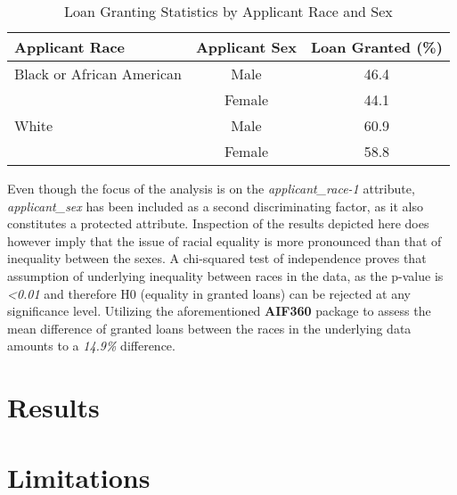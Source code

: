 \begin{table}[htbp]
    \centering
      \begin{tabular}{lcc}
      \toprule
      \textbf{Applicant Race} & \textbf{Applicant Sex} & \textbf{Loan Granted (\%)} \\
      \midrule
      Black or African American & Male    & 46.4 \\
            & Female  & 44.1 \\
      White & Male    & 60.9 \\
            & Female  & 58.8 \\
      \bottomrule
      \end{tabular}%
      \caption{Loan Granting Statistics by Applicant Race and Sex}
    \label{tab:loan_granting}%
\end{table}%

Even though the focus of the analysis is on the \textit{applicant\_race-1} attribute, \textit{applicant\_sex} has been included as a second discriminating factor, as it also constitutes a protected attribute.
Inspection of the results depicted here does however imply that the issue of racial equality is more pronounced than that of inequality between the sexes.
A chi-squared test of independence proves that assumption of underlying inequality between races in the data, as the p-value is \textit{<0.01} and therefore H0 (equality in granted loans) can be rejected at any significance level.
Utilizing the aforementioned \textbf{AIF360} package to assess the mean difference of granted loans between the races in the underlying data amounts to a \textit{14.9\%} difference.

\section{Results}\label{sec:Results}        



\section{Limitations}\label{sec:Limitations}